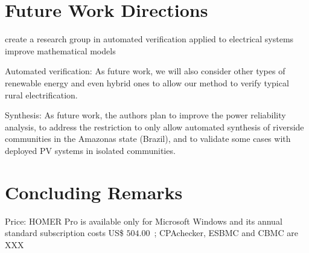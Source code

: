 \section{Future Work Directions}
create a research group in automated verification applied to electrical systems
improve mathematical models

Automated verification: As future work, we will also consider other types of renewable energy and even hybrid ones to allow our method to verify typical rural electrification.

Synthesis: As future work, the authors plan to improve the power reliability analysis, 
to address the restriction to only allow automated synthesis of 
riverside communities in the Amazonas state (Brazil), and to 
validate some cases with deployed PV systems in isolated communities.

\section{Concluding Remarks}

Price: HOMER Pro is available only for Microsoft Windows and its annual standard subscription costs US\$ $504.00$~\cite{HOMER}; CPAchecker, ESBMC and CBMC are XXX

